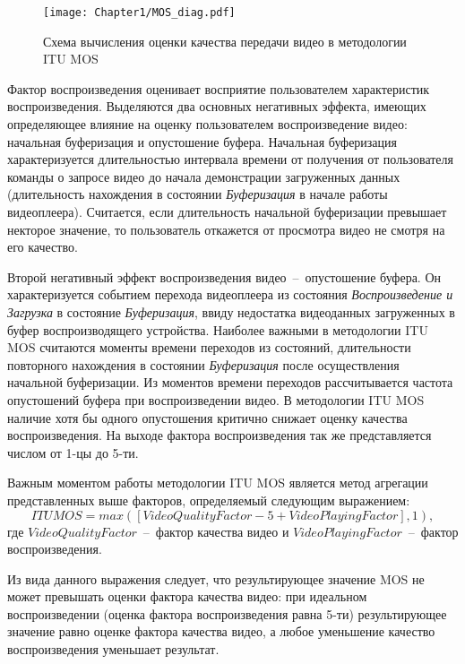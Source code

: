 \begin{figure}[htbp]
\begin{center}
\texttt{[image: Chapter1/MOS\_diag.pdf]}
\caption{Схема вычисления оценки качества передачи видео в методологии ITU MOS}
\label{fig:MOS_diag}
\end{center}
\end{figure}

Фактор воспроизведения оценивает восприятие пользователем характеристик воспроизведения. Выделяются два основных негативных эффекта, имеющих определяющее влияние на оценку пользователем воспроизведение видео: начальная буферизация и опустошение буфера. Начальная буферизация характеризуется длительностью интервала времени от получения от пользователя команды о запросе видео до начала демонстрации загруженных данных (длительность нахождения в состоянии \textit{Буферизация} в начале работы видеоплеера). Считается, если длительность начальной буферизации превышает некторое значение, то пользователь откажется от просмотра видео не смотря на его качество.

Второй негативный эффект воспроизведения видео~--~опустошение буфера. Он характеризуется событием перехода видеоплеера из состояния \textit{Воспроизведение и Загрузка} в состояние \textit{Буферизация}, ввиду недостатка видеоданных загруженных в буфер воспроизводящего устройства. Наиболее важными в методологии ITU MOS считаются моменты времени переходов из состояний, длительности повторного нахождения в состоянии \textit{Буферизация} после осуществления начальной буферизации. Из моментов времени переходов рассчитывается частота опустошений буфера при воспроизведении видео. В методологии ITU MOS наличие хотя бы одного опустошения критично снижает оценку качества воспроизведения. На выходе фактора воспроизведения так же представляется числом от 1-цы до 5-ти.

Важным моментом работы методологии ITU MOS является метод агрегации представленных выше факторов, определяемый следующим выражением:
$$ITU MOS = max ([VideoQualityFactor - 5 + VideoPlayingFactor], 1 ),$$
где $VideoQualityFactor$~--~фактор качества видео и $VideoPlayingFactor$~--~фактор воспроизведения.

Из вида данного выражения следует, что результирующее значение MOS не может превышать оценки фактора качества видео: при идеальном воспроизведении (оценка фактора воспроизведения равна 5-ти) результирующее значение равно оценке фактора качества видео, а любое уменьшение качество воспроизведения уменьшает результат.

